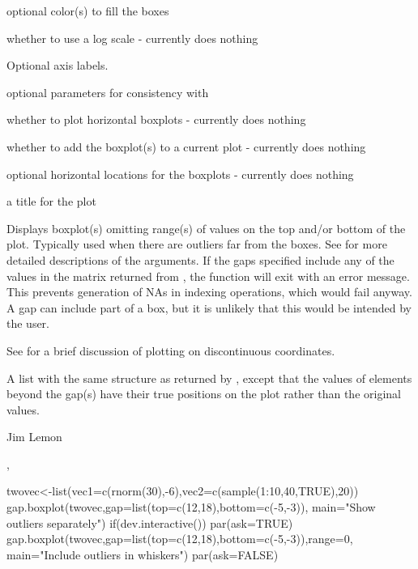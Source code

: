 \begin{Arguments}
\begin{ldescription}
\item[\code{col}] optional color(s) to fill the boxes
\item[\code{log}] whether to use a log scale - currently does nothing
\item[\code{axis.labels}] Optional axis labels.
\item[\code{pars}] optional parameters for consistency with 
\item[\code{horizontal}] whether to plot horizontal boxplots - currently
does nothing
\item[\code{add}] whether to add the boxplot(s) to a current plot - currently
does nothing
\item[\code{at}] optional horizontal locations for the boxplots - currently
does nothing
\item[\code{main}] a title for the plot
\end{ldescription}
\end{Arguments}
\begin{Details}\relax
Displays boxplot(s) omitting range(s) of values on the top and/or bottom
of the plot. Typically used when there are outliers far from the boxes.
See  for more detailed descriptions of the
arguments. If the gaps specified include any of the values in the 
matrix returned from , the function will exit with an
error message. This prevents generation of NAs in indexing operations,
which would fail anyway. A gap can include part of a box, but it is unlikely 
that this would be intended by the user.

See  for a brief discussion 
of plotting on discontinuous coordinates.
\end{Details}
\begin{Value}
A list with the same structure as returned by , except that
the values of elements beyond the gap(s) have their true positions on the
plot rather than the original values.
\end{Value}
\begin{Author}\relax
Jim Lemon
\end{Author}
\begin{SeeAlso}\relax
{},
\end{SeeAlso}
\begin{Examples}
\begin{ExampleCode}
 twovec<-list(vec1=c(rnorm(30),-6),vec2=c(sample(1:10,40,TRUE),20))
 gap.boxplot(twovec,gap=list(top=c(12,18),bottom=c(-5,-3)),
 main="Show outliers separately")
 if(dev.interactive()) par(ask=TRUE)
 gap.boxplot(twovec,gap=list(top=c(12,18),bottom=c(-5,-3)),range=0,
 main="Include outliers in whiskers")
 par(ask=FALSE)
\end{ExampleCode}
\end{Examples}

